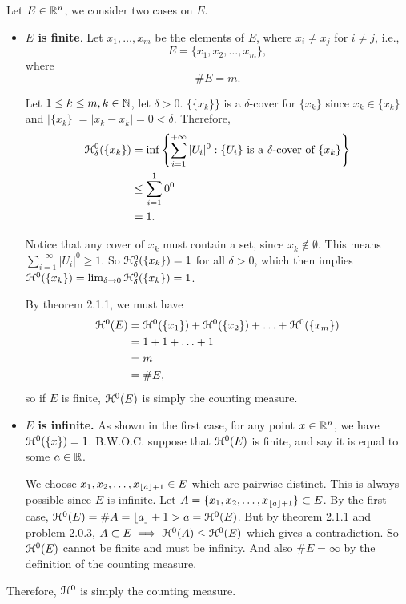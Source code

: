 Let \(E \in \mathbb{R}^n\), we consider two cases on \(E\).
\begin{itemize}
    \item \textbf{\(E\) is finite}. Let \(x_1, \ldots, x_m\) be the elements of \(E\), where \(x_i \neq x_j\) for \(i \neq j\), i.e.,
    \[
    E = \{x_1, x_2, \ldots, x_m\},
    \]
    where \[\# E = m.\]

    Let \(1 \leq k \leq m, k \in \mathbb{N}\), let \(\delta > 0\). \(\{\{x_k\}\}\) is a \(\delta\)-cover for \(\{x_k\}\) since \(x_k \in \{x_k\}\) and \(|\{x_k\}| = |x_k - x_k| = 0 < \delta\). Therefore,
    \begin{align*}
        \mathcal{H}_\delta^0(\{x_k\}) &= \inf \left\{\sum_{i = 1}^{+\infty} |U_i|^0 : \{U_i\} \text{ is a } \delta\text{-cover of }\{x_k\}\right\}\\
        &\leq \sum_{i = 1}^{1} 0^0\\
        &= 1.
    \end{align*}

    Notice that any cover of \(x_k\) must contain a set, since \(x_k \notin \emptyset\). This means \(\sum_{i = 1}^{+\infty} |U_i|^0 \geq 1\). So \(\mathcal{H}_\delta^0(\{x_k\}) = 1\) for all \(\delta > 0\), which then implies \(\mathcal{H}^0(\{x_k\}) = \lim_{\delta \to 0} \mathcal{H}_\delta^0(\{x_k\}) = 1\).

    By theorem 2.1.1, we must have
    \begin{align*}
        \mathcal{H}^0(E) &= \mathcal{H}^0(\{x_1\}) + \mathcal{H}^0(\{x_2\}) + \ldots + \mathcal{H}^0(\{x_m\})\\
        &= 1 + 1 + \ldots + 1\\
        &= m\\
        &= \# E,
    \end{align*}
    so if \(E\) is finite, \(\mathcal{H}^0(E)\) is simply the counting measure.

    \item \textbf{\(E\) is infinite.} As shown in the first case, for any point \(x \in \mathbb{R}^n\), we have \(\mathcal{H}^0(\{x\}) = 1\). B.W.O.C. suppose that \(\mathcal{H}^0(E)\) is finite, and say it is equal to some \(a \in \mathbb{R}\).

    We choose \(x_1, x_2, \ldots, x_{\lfloor a\rfloor + 1} \in E\) which are pairwise distinct. This is always possible since \(E\) is infinite. Let \(A = \{x_1, x_2, \ldots, x_{\lfloor a\rfloor+1}\} \subset E\). By the first case, \(\mathcal{H}^0(E) = \# A = \lfloor a\rfloor + 1 > a = \mathcal{H}^0(E)\). But by theorem 2.1.1 and problem 2.0.3, \(A \subset E \implies \mathcal{H}^0(A) \leq \mathcal{H}^0(E)\) which gives a contradiction. So \(\mathcal{H}^0(E)\) cannot be finite and must be infinity. And also \(\# E = \infty\) by the definition of the counting measure.
\end{itemize}

Therefore, \(\mathcal{H}^0\) is simply the counting measure.
